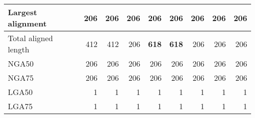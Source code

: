 \documentclass[12pt,a4paper]{article}
\begin{document}
\begin{table}[ht]
\begin{center}
\begin{tabular}{|l*{8}{|r}|}
Largest alignment & 206 & 206 & 206 & 206 & 206 & 206 & 206 & 206 \\ \hline
Total aligned length & 412 & 412 & 206 & {\bf 618} & {\bf 618} & 206 & 206 & 206 \\ \hline
NGA50 & 206 & 206 & 206 & 206 & 206 & 206 & 206 & 206 \\ \hline
NGA75 & 206 & 206 & 206 & 206 & 206 & 206 & 206 & 206 \\ \hline
LGA50 & 1 & 1 & 1 & 1 & 1 & 1 & 1 & 1 \\ \hline
LGA75 & 1 & 1 & 1 & 1 & 1 & 1 & 1 & 1 \\ \hline
\end{tabular}
\end{center}
\end{table}
\end{document}

